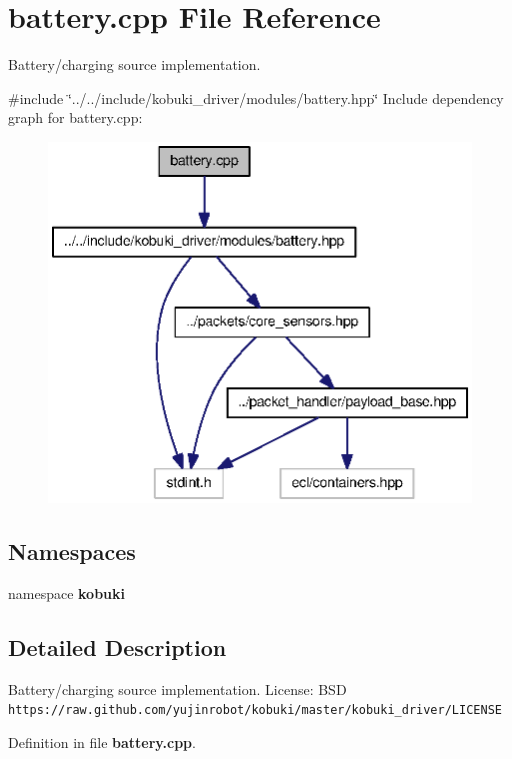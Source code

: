 \section{battery.\-cpp \-File \-Reference}
\label{battery_8cpp}


\-Battery/charging source implementation.  


{\ttfamily \#include \char`\"{}../../include/kobuki\-\_\-driver/modules/battery.\-hpp\char`\"{}}\*
\-Include dependency graph for battery.\-cpp\-:
\nopagebreak
\begin{figure}[H]
\begin{center}
\leavevmode
\includegraphics[width=342pt]{battery_8cpp__incl}
\end{center}
\end{figure}
\subsection*{\-Namespaces}
\begin{DoxyCompactItemize}
\item 
namespace {\bf kobuki}
\end{DoxyCompactItemize}


\subsection{\-Detailed \-Description}
\-Battery/charging source implementation. \-License\-: \-B\-S\-D {\tt https\-://raw.\-github.\-com/yujinrobot/kobuki/master/kobuki\-\_\-driver/\-L\-I\-C\-E\-N\-S\-E} 

\-Definition in file {\bf battery.\-cpp}.

